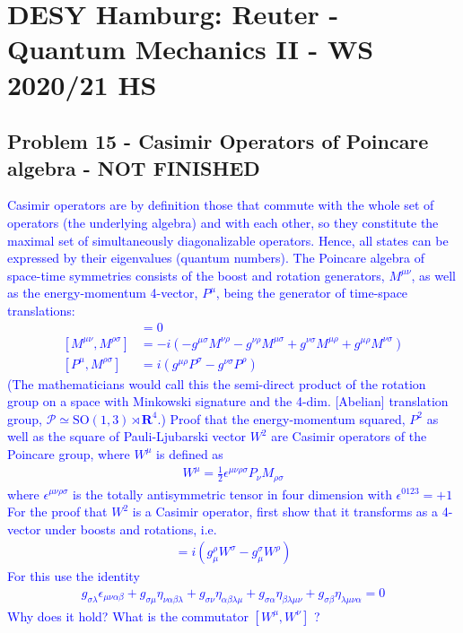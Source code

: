 \documentclass[../main.tex]{subfiles}
\begin{document}
\section{DESY Hamburg: {\sc Reuter} - Quantum Mechanics II - WS 2020/21 HS}

\subsection{Problem 15 - Casimir Operators of Poincare algebra  - NOT FINISHED}
\textcolor{blue}{
Casimir operators are by definition those that commute with the whole set of operators (the underlying algebra) and with each other, so they constitute the maximal set of simultaneously diagonalizable operators. Hence, all states
can be expressed by their eigenvalues (quantum numbers).
The Poincare algebra of space-time symmetries consists of the boost and rotation generators, $M^{\mu\nu}$, as well as the energy-momentum 4-vector, $P^\mu$, being the generator of time-space translations:
\begin{align}
[P^\mu,P^\nu]&=0\\
[M^{\mu\nu},M^{\rho\sigma}]&=-i(-
g^{\mu\sigma}M^{\nu\rho}-
g^{\nu\rho}M^{\mu\sigma}+
g^{\nu\sigma}M^{\mu\rho}+
g^{\mu\rho}M^{\nu\sigma}
)\\
[P^\mu,M^{\rho\sigma}]&=i(g^{\mu\rho}P^\sigma-g^{\nu\sigma}P^\rho)
\end{align}
(The mathematicians would call this the semi-direct product of the rotation group on a space with Minkowski signature and the 4-dim. [Abelian] translation group, $\mathcal{P}\simeq \text{SO}(1,3) \rtimes \mathbf{R}^4.$)\newline
Proof that the energy-momentum squared, $P^2$ as well as the square of Pauli-Ljubarski vector $W^2$ are Casimir operators of the Poincare group, where $W^\mu$ is defined as
\begin{align}
W^\mu=\frac{1}{2}\epsilon^{\mu\nu\rho\sigma}P_\nu M_{\rho\sigma}
\end{align}
where $\epsilon^{\mu\nu\rho\sigma}$ is the totally antisymmetric tensor in four dimension with  $\epsilon^{0123}=+1$
For the proof that $W^2$ is a Casimir operator, first show that it transforms as a 4-vector under boosts and rotations, i.e.
\begin{align}
[W_\mu,M^{\rho,\sigma}]=i(g^\rho_\mu W^\sigma-g^\sigma_\mu W^\rho)
\end{align}
For this use the identity
\begin{align}
g_{\sigma\lambda}\epsilon_{\mu\nu\alpha\beta}+
g_{\sigma\mu}\eta_{\nu\alpha\beta\lambda}+
g_{\sigma\nu}\eta_{\alpha\beta\lambda\mu}+
g_{\sigma\alpha}\eta_{\beta\lambda\mu\nu}+
g_{\sigma\beta}\eta_{\lambda\mu\nu\alpha}=0
\end{align}
Why does it hold? What is the commutator $[W^\mu,W^\nu]$ ?
}
\end{document}
